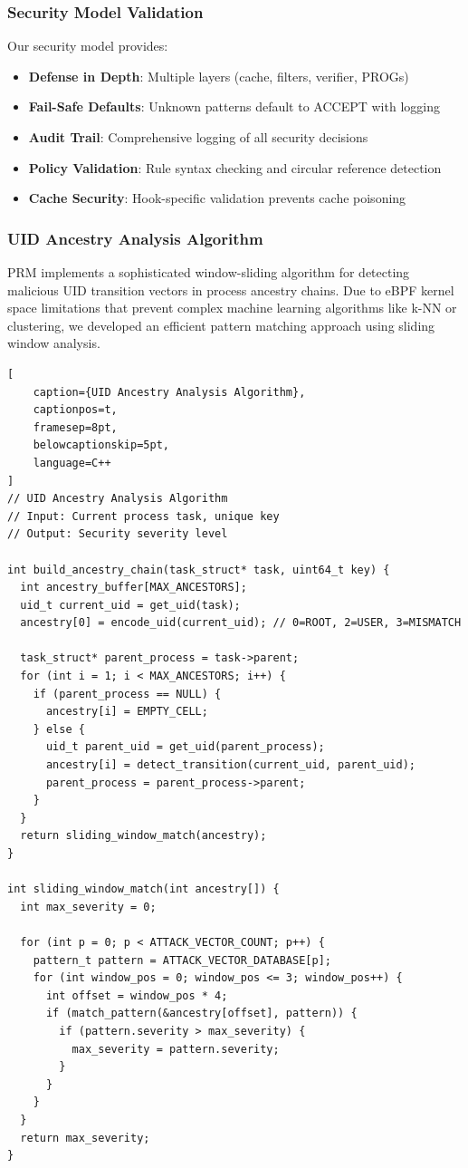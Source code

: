 \documentclass[conference]{IEEEtran}
\begin{document}
\subsubsection{Security Model Validation}
Our security model provides:
\begin{itemize}
\item \textbf{Defense in Depth}: Multiple layers (cache, filters, verifier, PROGs)
\item \textbf{Fail-Safe Defaults}: Unknown patterns default to ACCEPT with logging
\item \textbf{Audit Trail}: Comprehensive logging of all security decisions
\item \textbf{Policy Validation}: Rule syntax checking and circular reference detection
\item \textbf{Cache Security}: Hook-specific validation prevents cache poisoning
\end{itemize}

\subsubsection{UID Ancestry Analysis Algorithm}
PRM implements a sophisticated window-sliding algorithm for detecting malicious UID transition vectors in process ancestry chains. Due to eBPF kernel space limitations that prevent complex machine learning algorithms like k-NN or clustering, we developed an efficient pattern matching approach using sliding window analysis.

\begin{lstlisting}[
    caption={UID Ancestry Analysis Algorithm},
    captionpos=t,
    framesep=8pt,
    belowcaptionskip=5pt,
    language=C++
]
// UID Ancestry Analysis Algorithm
// Input: Current process task, unique key
// Output: Security severity level

int build_ancestry_chain(task_struct* task, uint64_t key) {
  int ancestry_buffer[MAX_ANCESTORS];
  uid_t current_uid = get_uid(task);
  ancestry[0] = encode_uid(current_uid); // 0=ROOT, 2=USER, 3=MISMATCH
  
  task_struct* parent_process = task->parent;
  for (int i = 1; i < MAX_ANCESTORS; i++) {
    if (parent_process == NULL) {
      ancestry[i] = EMPTY_CELL;
    } else {
      uid_t parent_uid = get_uid(parent_process);
      ancestry[i] = detect_transition(current_uid, parent_uid);
      parent_process = parent_process->parent;
    }
  }
  return sliding_window_match(ancestry);
}

int sliding_window_match(int ancestry[]) {
  int max_severity = 0;
  
  for (int p = 0; p < ATTACK_VECTOR_COUNT; p++) {
    pattern_t pattern = ATTACK_VECTOR_DATABASE[p];
    for (int window_pos = 0; window_pos <= 3; window_pos++) {
      int offset = window_pos * 4;
      if (match_pattern(&ancestry[offset], pattern)) {
        if (pattern.severity > max_severity) {
          max_severity = pattern.severity;
        }
      }
    }
  }
  return max_severity;
}
\end{lstlisting}
\end{document}
